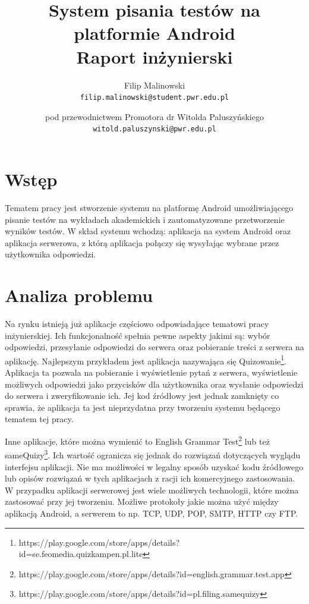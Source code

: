 \documentclass{report}
\title{%
	System pisania testów na platformie Android \\
	\large Raport inżynierski}
\author{
	Filip Malinowski\\
	\texttt{filip.malinowski@student.pwr.edu.pl}
	\and
	pod przewodnictwem Promotora dr Witolda Paluszyńskiego\\
	\texttt{witold.paluszynski@pwr.edu.pl}
}
\date{}
\begin{document}


	\chapter{Wstęp}

	Tematem pracy jest stworzenie systemu na platformę Android umożliwiającego pisanie testów na wykładach akademickich i zautomatyzowane przetworzenie wyników testów. W skład systemu wchodzą: aplikacja na system Android oraz aplikacja serwerowa, z którą aplikacja połączy się wysyłając wybrane przez użytkownika odpowiedzi.\\
	
	\chapter{Analiza problemu}
	
	Na rynku istnieją już aplikacje częściowo odpowiadające tematowi pracy inżynierskiej. Ich funkcjonalność spełnia pewne aspekty jakimi są: wybór odpowiedzi, przesyłanie odpowiedzi do serwera oraz pobieranie treści z serwera na aplikację. Najlepszym przykładem jest aplikacja nazywająca się Quizowanie\footnote{https://play.google.com/store/apps/details?id=se.feomedia.quizkampen.pl.lite}. Aplikacja ta pozwala na pobieranie i wyświetlenie pytań z serwera, wyświetlenie możliwych odpowiedzi jako przycisków dla użytkownika oraz wysłanie odpowiedzi do serwera i zweryfikowanie ich. Jej kod źródłowy jest jednak zamknięty co sprawia, że aplikacja ta jest nieprzydatna  przy tworzeniu systemu będącego tematem tej pracy.
	
	Inne aplikacje, które można wymienić to English Grammar Test\footnote{https://play.google.com/store/apps/details?id=english.grammar.test.app} lub też sameQuizy\footnote{https://play.google.com/store/apps/details?id=pl.filing.samequizy}. Ich wartość ogranicza się jednak do rozwiązań dotyczących wyglądu interfejsu aplikacji. Nie ma możliwości w legalny sposób uzyskać kodu źródłowego lub opisów rozwiązań w tych aplikacjach z racji ich komercyjnego zastosowania.
	\\
	W przypadku aplikacji serwerowej jest wiele możliwych technologii, które można zastosować przy jej tworzeniu. Możliwe protokoły jakie można użyć między aplikacją Android, a serwerem to np. TCP, UDP, POP, SMTP, HTTP czy FTP.
	
\end{document}
